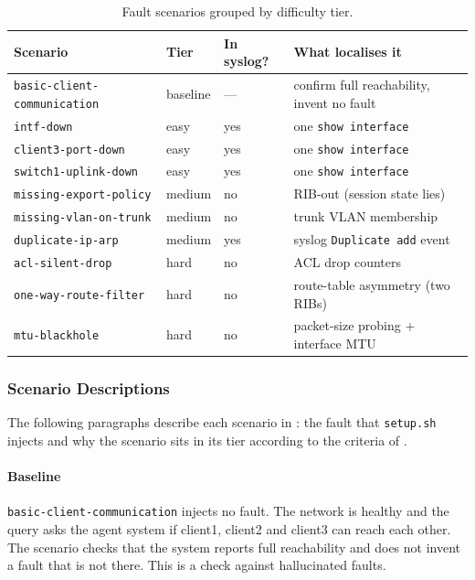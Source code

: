 \begin{table}[htbp]
\centering
\small
\begin{tabular}{@{}llll@{}}
\toprule
\textbf{Scenario} & \textbf{Tier} & \textbf{In syslog?} & \textbf{What localises it} \\
\midrule
\texttt{basic-client-communication} & baseline & --- & confirm full reachability, invent no fault \\
\texttt{intf-down}            & easy   & yes & one \texttt{show interface} \\
\texttt{client3-port-down}    & easy   & yes & one \texttt{show interface} \\
\texttt{switch1-uplink-down}  & easy   & yes & one \texttt{show interface} \\
\texttt{missing-export-policy}& medium & no  & RIB-out (session state lies) \\
\texttt{missing-vlan-on-trunk}& medium & no  & trunk VLAN membership \\
\texttt{duplicate-ip-arp}     & medium & yes & syslog \texttt{Duplicate add} event \\
\texttt{acl-silent-drop}      & hard   & no  & ACL drop counters \\
\texttt{one-way-route-filter} & hard   & no  & route-table asymmetry (two RIBs) \\
\texttt{mtu-blackhole}        & hard   & no  & packet-size probing + interface MTU \\
\bottomrule
\end{tabular}
\caption{Fault scenarios grouped by difficulty tier.}
\label{tab:scenarios}
\end{table}

\subsubsection{Scenario Descriptions}
\label{sec:scenario-descriptions}
The following paragraphs describe each scenario in : the fault that
\texttt{setup.sh} injects and why the scenario sits in its tier according to the criteria of
.

\paragraph{Baseline}
\texttt{basic-client-communication} injects no fault. The network is healthy and the query asks
the agent system if client1, client2 and client3 can reach each other. The scenario checks that the system reports full
reachability and does not invent a fault that is not there. This is a check against hallucinated
faults.

